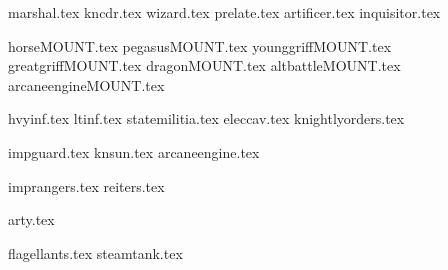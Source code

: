 
{marshal.tex}
{kncdr.tex}
{wizard.tex}
{prelate.tex}
{artificer.tex}
{inquisitor.tex}

\clearpage
{}
{horseMOUNT.tex}
{pegasusMOUNT.tex}
{younggriffMOUNT.tex}
{greatgriffMOUNT.tex}
{dragonMOUNT.tex}
{altbattleMOUNT.tex}
{arcaneengineMOUNT.tex}

\clearpage
{}
{hvyinf.tex}
{ltinf.tex}
{statemilitia.tex}
{eleccav.tex}
{knightlyorders.tex}

\clearpage
{}
{impguard.tex}
{knsun.tex}
{arcaneengine.tex}

\clearpage
{}
{imprangers.tex}
{reiters.tex}

\clearpage
{}
{arty.tex}

\clearpage
{}
{flagellants.tex}
{steamtank.tex}
